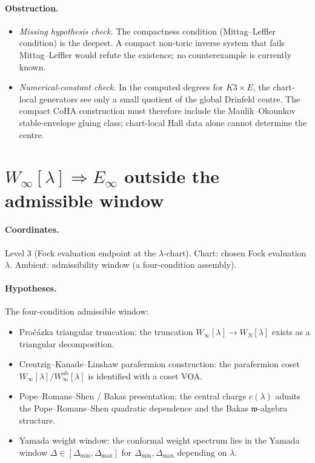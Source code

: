 \paragraph{Obstruction.}
\begin{itemize}[nosep]
\item \emph{Missing hypothesis check.} The compactness condition
  (Mittag--Leffler condition) is the deepest. A compact non-toric
  inverse system that fails Mittag--Leffler would refute the existence;
  no counterexample is currently known.
\item \emph{Numerical-constant check.} In the computed degrees for
  \(K3\times E\), the chart-local generators see only a small quotient
  of the global Drinfeld centre.  The compact CoHA construction must
  therefore include the Maulik--Okounkov stable-envelope gluing class;
  chart-local Hall data alone cannot determine the centre.
\end{itemize}

\section{$W_\infty[\lambda] \Rightarrow E_\infty$ outside the
admissible window}
\label{sec:open-Winfty-Einfty}

\paragraph{Coordinates.} Level 3 (Fock evaluation endpoint at the
$\lambda$-chart). Chart: chosen Fock evaluation $\lambda$. Ambient:
admissibility window (a four-condition assembly).

\paragraph{Hypotheses.} The four-condition admissible window:
\begin{itemize}[nosep]
\item Pro\v{c}\'azka triangular truncation: the truncation
  $W_\infty[\lambda] \to W_N[\lambda]$ exists as a triangular
  decomposition.
\item Creutzig--Kanade--Linshaw parafermion construction: the
  parafermion coset
  $W_\infty[\lambda] / W_\infty^{\mathrm{ab}}[\lambda]$ is identified
  with a coset VOA.
\item Pope--Romans--Shen / Bakas presentation: the central charge
  $c(\lambda)$ admits the Pope--Romans--Shen quadratic dependence and
  the Bakas $\mathfrak{w}$-algebra structure.
\item Yamada weight window: the conformal weight spectrum lies in the
  Yamada window $\Delta \in [\Delta_{\min}, \Delta_{\max}]$ for
  $\Delta_{\min}, \Delta_{\max}$ depending on $\lambda$.
\end{itemize}

